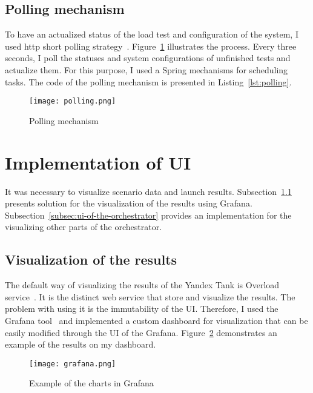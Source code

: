 \subsection{Polling mechanism}\label{subsec:polling_mechanism}
To have an actualized status of the load test and configuration of the system, I used http short polling strategy~\cite{http_polling}.
Figure~\ref{fig:polling} illustrates the process. Every three seconds, I poll the statuses and system configurations of unfinished tests and actualize them.
For this purpose, I used a Spring mechanisms for scheduling tasks. The code of the polling mechanism is presented in Listing~\ref{lst:polling}.
\begin{figure}[t]
    \centering
    \texttt{[image: polling.png]}
    \caption{Polling mechanism}
    \label{fig:polling}
\end{figure}




\section{Implementation of UI}\label{sec:implementation-of-ui}
It was necessary to visualize scenario data and launch results.
Subsection~\ref{subsec:visualization-of-the-results} presents solution for the visualization of the results using Grafana.
Subsection~\ref{subsec:ui-of-the-orchestrator} provides an implementation for the visualizing other parts of the orchestrator.
\subsection{Visualization of the results}\label{subsec:visualization-of-the-results}
The default way of visualizing the results of the Yandex Tank is Overload service~\cite{overload}. It is the distinct web service that store and visualize the results. The problem with using it is the immutability of the UI. Therefore, I used the Grafana tool~\cite{grafana} and implemented a custom dashboard for visualization that can be easily modified through the UI of the Grafana. Figure~\ref{fig:grafana} demonstrates an example of the results on my dashboard.
\begin{figure}[t]
    \centering
    \texttt{[image: grafana.png]}
    \caption{Example of the charts in Grafana}
    \label{fig:grafana}
\end{figure}

